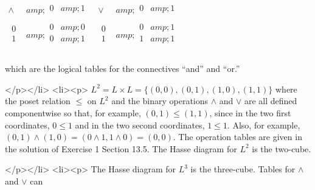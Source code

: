 \(\begin{array}{c|c}
 \land  &amp; 
\begin{array}{cc}
 0 &amp; 1 \\
\end{array}
 \\
\hline
 
\begin{array}{c}
 0 \\
 1 \\
\end{array}
 &amp; 
\begin{array}{cc}
 0 &amp; 0 \\
 0 &amp; 1 \\
\end{array}
 \\
\end{array}\)     \(\begin{array}{c|c}
 \lor  &amp; 
\begin{array}{cc}
 0 &amp; 1 \\
\end{array}
 \\
\hline
 
\begin{array}{c}
 0 \\
 1 \\
\end{array}
 &amp; 
\begin{array}{cc}
 0 &amp; 1 \\
 1 &amp; 1 \\
\end{array}
 \\
\end{array}\)



which are the logical tables for the connectives {``}and{''} and {``}or.{''}

</p></li>
<li><p> \(L ^2 = L \times  L = \{(0, 0), (0, 1), (1, 0), (1, 1)\}\) where the poset relation $\leq $ on \(L^2\) and the binary operations $\land $ and
$\lor $ are all defined componentwise so that, for example, \((0, 1) \leq  (1, 1)\), since in the two first coordinates, \(0\leq 1\) and in the two
second coordinates, \(1\leq 1\). Also, for example, \((0, 1) \land  (1, 0) = (0 \land  1, 1 \land  0) = (0, 0)\). The operation tables are given
in the solution of Exercise 1 Section 13.5. The Hasse diagram for \(L^2\) is the two-cube.

</p></li>
<li><p> The Hasse diagram for \(L^3\) is the three-cube.  Tables for $\land $ and $\lor $ can



